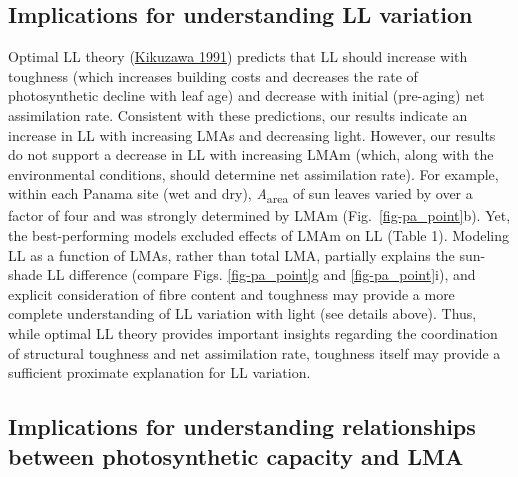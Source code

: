 \documentclass[
  12pt,
  letterpaper,
  DIV=11,
  numbers=noendperiod]{scrartcl}
\begin{document}
\hypertarget{implications-for-understanding-ll-variation}{%
\subsection{Implications for understanding LL
variation}\label{implications-for-understanding-ll-variation}}

Optimal LL theory (\protect\hyperlink{ref-Kikuzawa1991}{Kikuzawa 1991})
predicts that LL should increase with toughness (which increases
building costs and decreases the rate of photosynthetic decline with
leaf age) and decrease with initial (pre-aging) net assimilation rate.
Consistent with these predictions, our results indicate an increase in
LL with increasing LMAs and decreasing light. However, our results do
not support a decrease in LL with increasing LMAm (which, along with the
environmental conditions, should determine net assimilation rate). For
example, within each Panama site (wet and dry),
\emph{A}\textsubscript{area} of sun leaves varied by over a factor of
four and was strongly determined by LMAm (Fig.~\ref{fig-pa_point}b).
Yet, the best-performing models excluded effects of LMAm on LL (Table
1). Modeling LL as a function of LMAs, rather than total LMA, partially
explains the sun-shade LL difference (compare Figs. \ref{fig-pa_point}g
and \ref{fig-pa_point}i), and explicit consideration of fibre content
and toughness may provide a more complete understanding of LL variation
with light (see details above). Thus, while optimal LL theory provides
important insights regarding the coordination of structural toughness
and net assimilation rate, toughness itself may provide a sufficient
proximate explanation for LL variation.

\hypertarget{implications-for-understanding-relationships-between-photosynthetic-capacity-and-lma}{%
\subsection{Implications for understanding relationships between
photosynthetic capacity and
LMA}\label{implications-for-understanding-relationships-between-photosynthetic-capacity-and-lma}}
\end{document}

